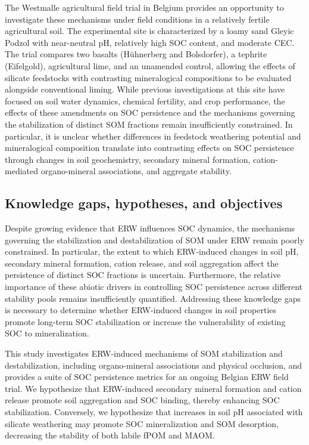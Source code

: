 \documentclass[preprint,12pt]{elsarticle}
\begin{document}
The Westmalle agricultural field trial in Belgium provides an opportunity to investigate these mechanisms under field conditions in a relatively fertile agricultural soil. The experimental site is characterized by a loamy sand Gleyic Podzol with near-neutral pH, relatively high SOC content, and moderate CEC. The trial compares two basalts (Hühnerberg and Bolsdorfer), a tephrite (Eifelgold), agricultural lime, and an unamended control, allowing the effects of silicate feedstocks with contrasting mineralogical compositions to be evaluated alongside conventional liming. While previous investigations at this site have focused on soil water dynamics, chemical fertility, and crop performance, the effects of these amendments on SOC persistence and the mechanisms governing the stabilization of distinct SOM fractions remain insufficiently constrained. In particular, it is unclear whether differences in feedstock weathering potential and mineralogical composition translate into contrasting effects on SOC persistence through changes in soil geochemistry, secondary mineral formation, cation-mediated organo-mineral associations, and aggregate stability.

\subsection{Knowledge gaps, hypotheses, and objectives}

Despite growing evidence that ERW influences SOC dynamics, the mechanisms governing the stabilization and destabilization of SOM under ERW remain poorly constrained. In particular, the extent to which ERW-induced changes in soil pH, secondary mineral formation, cation release, and soil aggregation affect the persistence of distinct SOC fractions is uncertain. Furthermore, the relative importance of these abiotic drivers in controlling SOC persistence across different stability pools remains insufficiently quantified. Addressing these knowledge gaps is necessary to determine whether ERW-induced changes in soil properties promote long-term SOC stabilization or increase the vulnerability of existing SOC to mineralization.

This study investigates ERW-induced mechanisms of SOM stabilization and destabilization, including organo-mineral associations and physical occlusion, and provides a suite of SOC persistence metrics for an ongoing Belgian ERW field trial. We hypothesize that ERW-induced secondary mineral formation and cation release promote soil aggregation and SOC binding, thereby enhancing SOC stabilization. Conversely, we hypothesize that increases in soil pH associated with silicate weathering may promote SOC mineralization and SOM desorption, decreasing the stability of both labile fPOM and MAOM.
\end{document}
